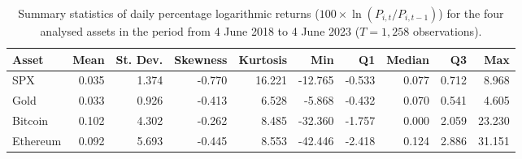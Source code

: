 \begin{table}[htbp]
\centering
\caption{Summary statistics of daily percentage logarithmic returns ($100 \times \ln(P_{i,t}/P_{i,t-1})$) for the four analysed assets in the period from 4 June 2018 to 4 June 2023 ($T = 1{,}258$ observations).}
\label{tab:descriptive_statistics}
\vspace{0.5em}
\begin{tabular}{lrrrrrrrrr}
\toprule
\textbf{Asset} & \textbf{Mean} & \textbf{St. Dev.} & \textbf{Skewness} & \textbf{Kurtosis} & \textbf{Min} & \textbf{Q1} & \textbf{Median} & \textbf{Q3} & \textbf{Max} \\
\midrule
SPX      & 0.035 & 1.374 & -0.770 & 16.221 & -12.765 & -0.533 & 0.077 & 0.712 &  8.968 \\
Gold     & 0.033 & 0.926 & -0.413 &  6.528 &  -5.868 & -0.432 & 0.070 & 0.541 &  4.605 \\
Bitcoin  & 0.102 & 4.302 & -0.262 &  8.485 & -32.360 & -1.757 & 0.000 & 2.059 & 23.230 \\
Ethereum & 0.092 & 5.693 & -0.445 &  8.553 & -42.446 & -2.418 & 0.124 & 2.886 & 31.151 \\
\bottomrule
\end{tabular}
\end{table}

